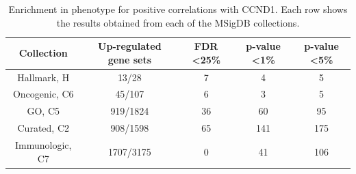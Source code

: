\begin{table}[h!]
    \begin{tabular}{ccccc}
    \hline
    Collection      & Up-regulated gene sets & FDR \textless 25\% & p-value \textless 1\% & p-value \textless 5\% \\ \hline
    Hallmark, H     & 13/28                  & 7                                 & 4                                    & 5                                    \\
    Oncogenic, C6   & 45/107                 & 6                                 & 3                                    & 5                                    \\
    GO, C5          & 919/1824               & 36                                & 60                                   & 95                                   \\
    Curated, C2     & 908/1598               & 65                                & 141                                  & 175                                  \\
    Immunologic, C7 & 1707/3175              & 0                                 & 41                                   & 106                                  \\ \hline
    \end{tabular}%
    \caption{Enrichment in phenotype for positive correlations with CCND1. Each row shows the results obtained from each of the MSigDB collections.}
    \label{enr_ph_positive}
    \end{table}


